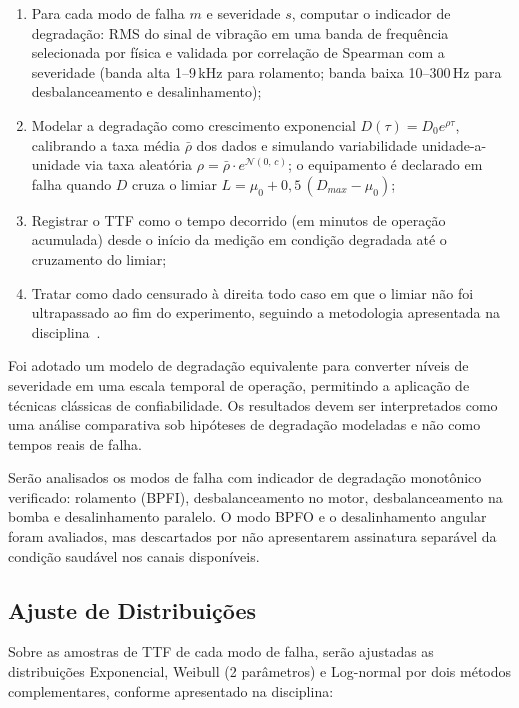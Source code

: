 \documentclass[conference]{IEEEtran}
\begin{document}
\begin{enumerate}
    \item Para cada modo de falha $m$ e severidade $s$, computar o
    indicador de degradação: RMS do sinal de vibração em uma banda
    de frequência selecionada por física e validada por correlação de
    Spearman com a severidade (banda alta 1--9\,kHz para rolamento;
    banda baixa 10--300\,Hz para desbalanceamento e desalinhamento);
    \item Modelar a degradação como crescimento exponencial
    $D(\tau)=D_0 e^{\rho\tau}$, calibrando a taxa média $\bar\rho$ dos
    dados e simulando variabilidade unidade-a-unidade via taxa aleatória
    $\rho=\bar\rho\cdot e^{\mathcal{N}(0,\,c)}$; o equipamento é
    declarado em falha quando $D$ cruza o limiar
    $L=\mu_0+0{,}5\,(D_{max}-\mu_0)$;
    \item Registrar o TTF como o tempo decorrido (em minutos de
    operação acumulada) desde o início da medição em condição
    degradada até o cruzamento do limiar;
    \item Tratar como dado censurado à direita todo caso em
    que o limiar não foi ultrapassado ao fim do experimento, seguindo
    a metodologia apresentada na disciplina~\cite{bessani2026,colosimo2006}.
\end{enumerate}

Foi adotado um modelo de degradação equivalente para converter níveis de severidade em uma escala temporal de operação, permitindo a aplicação de técnicas clássicas de confiabilidade. Os resultados devem ser interpretados como uma análise comparativa sob hipóteses de degradação modeladas e não como tempos reais de falha.

Serão analisados os modos de falha com indicador de degradação
monotônico verificado: rolamento (BPFI), desbalanceamento no motor,
desbalanceamento na bomba e desalinhamento paralelo. O modo BPFO e o
desalinhamento angular foram avaliados, mas descartados por não
apresentarem assinatura separável da condição saudável nos canais disponíveis.

\subsection{Ajuste de Distribuições}

Sobre as amostras de TTF de cada modo de falha, serão ajustadas as
distribuições Exponencial, Weibull (2 parâmetros) e Log-normal por dois
métodos complementares, conforme apresentado na disciplina:
\end{document}
